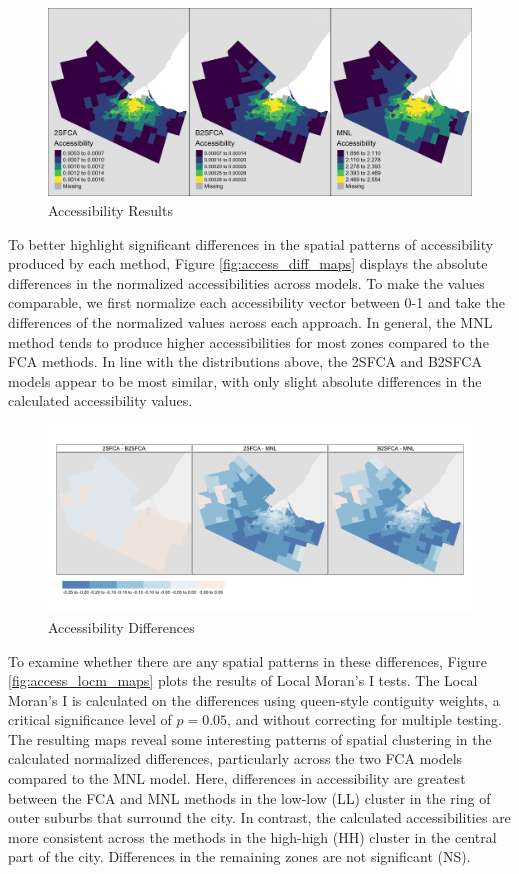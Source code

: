 \documentclass{article}
\begin{document}
\begin{figure}
\includegraphics[width=1\linewidth]{./img/access_maps} \caption{\label{fig:access_maps}Accessibility Results}\label{fig:plot access_maps}
\end{figure}

To better highlight significant differences in the spatial patterns of
accessibility produced by each method, Figure \ref{fig:access_diff_maps}
displays the absolute differences in the normalized accessibilities
across models. To make the values comparable, we first normalize each
accessibility vector between 0-1 and take the differences of the
normalized values across each approach. In general, the MNL method tends
to produce higher accessibilities for most zones compared to the FCA
methods. In line with the distributions above, the 2SFCA and B2SFCA
models appear to be most similar, with only slight absolute differences
in the calculated accessibility values.

\begin{figure}
\includegraphics[width=1\linewidth]{./img/access_diff_maps} \caption{\label{fig:access_diff_maps}Accessibility Differences}\label{fig:plot access_diff_maps}
\end{figure}

To examine whether there are any spatial patterns in these differences,
Figure \ref{fig:access_locm_maps} plots the results of Local Moran's I
tests. The Local Moran's I is calculated on the differences using
queen-style contiguity weights, a critical significance level of
\(p=0.05\), and without correcting for multiple testing. The resulting
maps reveal some interesting patterns of spatial clustering in the
calculated normalized differences, particularly across the two FCA
models compared to the MNL model. Here, differences in accessibility are
greatest between the FCA and MNL methods in the low-low (LL) cluster in
the ring of outer suburbs that surround the city. In contrast, the
calculated accessibilities are more consistent across the methods in the
high-high (HH) cluster in the central part of the city. Differences in
the remaining zones are not significant (NS).
\end{document}
